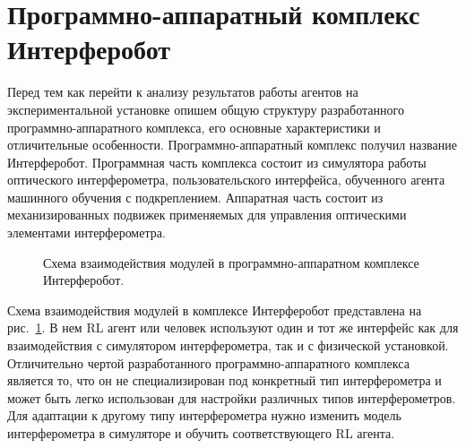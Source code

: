         

\section{Программно-аппаратный комплекс Интерферобот}

Перед тем как перейти к анализу результатов работы агентов на экспериментальной установке опишем общую структуру разработанного программно-аппаратного комплекса, его основные характеристики и отличительные особенности. Программно-аппаратный комплекс получил название Интерферобот. Программная часть комплекса состоит из симулятора работы оптического интерферометра, пользовательского интерфейса, обученного агента машинного обучения с подкреплением. Аппаратная часть состоит из механизированных подвижек применяемых для управления оптическими элементами интерферометра. 

\begin{figure}[ht]
\caption{Схема взаимодействия модулей в программно-аппаратном комплексе Интерферобот.}
\label{fig:interf_complex}
\end{figure}

Схема взаимодействия модулей в комплексе Интерферобот представлена на рис.~\ref{fig:interf_complex}. В нем RL агент или человек используют один и тот же интерфейс как для взаимодействия с симулятором интерферометра, так и с физической установкой. Отличительно чертой разработанного программно-аппаратного комплекса является то, что он не специализирован под конкретный тип интерферометра и может быть легко использован для настройки различных типов интерферометров. Для адаптации к другому типу интерферометра нужно изменить модель интерферометра в симуляторе и обучить соответствующего RL агента. 

